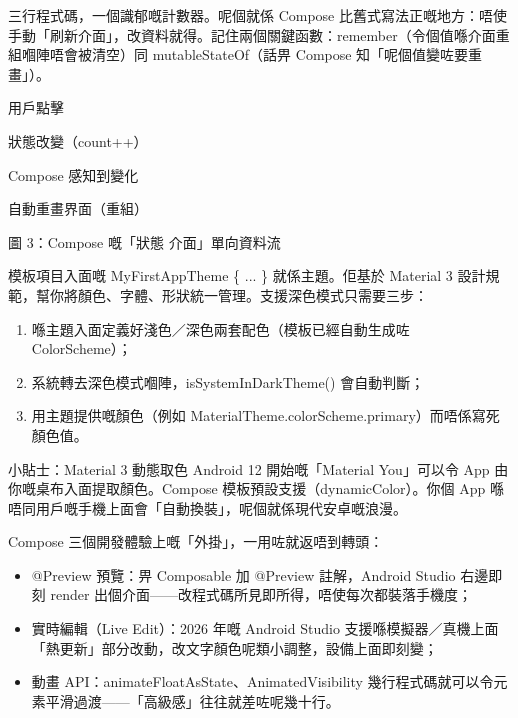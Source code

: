 三行程式碼，一個識郁嘅計數器。呢個就係 Compose 比舊式寫法正嘅地方：唔使手動「刷新介面」，改資料就得。記住兩個關鍵函數：remember（令個值喺介面重組嗰陣唔會被清空）同 mutableStateOf（話畀 Compose 知「呢個值變咗要重畫」）。

用戶點擊

狀態改變（count++）

Compose 感知到變化

自動重畫界面（重組）

\begin{center}\small\color{gray}圖 3：Compose 嘅「狀態 介面」單向資料流\end{center}


模板項目入面嘅 MyFirstAppTheme \{ ... \} 就係主題。佢基於 Material 3 設計規範，幫你將顏色、字體、形狀統一管理。支援深色模式只需要三步：

\begin{enumerate}
  \item 喺主題入面定義好淺色／深色兩套配色（模板已經自動生成咗 ColorScheme）；
  \item 系統轉去深色模式嗰陣，isSystemInDarkTheme() 會自動判斷；
  \item 用主題提供嘅顏色（例如 MaterialTheme.colorScheme.primary）而唔係寫死顏色值。
\end{enumerate}

\begin{tcbinfo}{小貼士：Material 3 動態取色}
Android 12 開始嘅「Material You」可以令 App 由你嘅桌布入面提取顏色。Compose 模板預設支援（dynamicColor）。你個 App 喺唔同用戶嘅手機上面會「自動換裝」，呢個就係現代安卓嘅浪漫。

\end{tcbinfo}


Compose 三個開發體驗上嘅「外掛」，一用咗就返唔到轉頭：

\begin{itemize}
  \item @Preview 預覽：畀 Composable 加 @Preview 註解，Android Studio 右邊即刻 render 出個介面——改程式碼所見即所得，唔使每次都裝落手機度；
  \item 實時編輯（Live Edit）：2026 年嘅 Android Studio 支援喺模擬器／真機上面「熱更新」部分改動，改文字顏色呢類小調整，設備上面即刻變；
  \item 動畫 API：animateFloatAsState、AnimatedVisibility 幾行程式碼就可以令元素平滑過渡——「高級感」往往就差咗呢幾十行。
\end{itemize}

